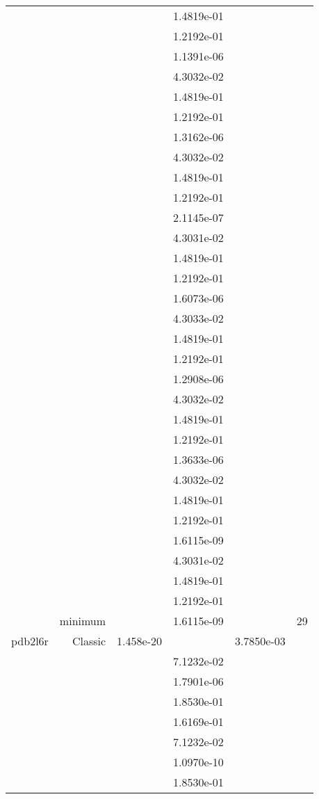\begin{xltabular}{\textwidth}{r|rS[table-format=1.3e+2]S[table-format=1.4e+2]S[table-format=1.4e+2]S[table-format=-1.5]}
&  &  & 1.4819e-01 & & \\
&  &  & 1.2192e-01 & & \\
&  &  & 1.1391e-06 & & \\
&  &  & 4.3032e-02 & & \\
&  &  & 1.4819e-01 & & \\
&  &  & 1.2192e-01 & & \\
&  &  & 1.3162e-06 & & \\
&  &  & 4.3032e-02 & & \\
&  &  & 1.4819e-01 & & \\
&  &  & 1.2192e-01 & & \\
&  &  & 2.1145e-07 & & \\
&  &  & 4.3031e-02 & & \\
&  &  & 1.4819e-01 & & \\
&  &  & 1.2192e-01 & & \\
&  &  & 1.6073e-06 & & \\
&  &  & 4.3033e-02 & & \\
&  &  & 1.4819e-01 & & \\
&  &  & 1.2192e-01 & & \\
&  &  & 1.2908e-06 & & \\
&  &  & 4.3032e-02 & & \\
&  &  & 1.4819e-01 & & \\
&  &  & 1.2192e-01 & & \\
&  &  & 1.3633e-06 & & \\
&  &  & 4.3032e-02 & & \\
&  &  & 1.4819e-01 & & \\
&  &  & 1.2192e-01 & & \\
&  &  & 1.6115e-09 & & \\
&  &  & 4.3031e-02 & & \\
&  &  & 1.4819e-01 & & \\
&  &  & 1.2192e-01 & & \\
& minimum &  & 1.6115e-09 & & 29 \\  \addlinespace
pdb2l6r & Classic & 1.458e-20 &  & 3.7850e-03 & \\
&  &  & 7.1232e-02 & & \\
&  &  & 1.7901e-06 & & \\
&  &  & 1.8530e-01 & & \\
&  &  & 1.6169e-01 & & \\
&  &  & 7.1232e-02 & & \\
&  &  & 1.0970e-10 & & \\
&  &  & 1.8530e-01 & & \\

\end{xltabular}
